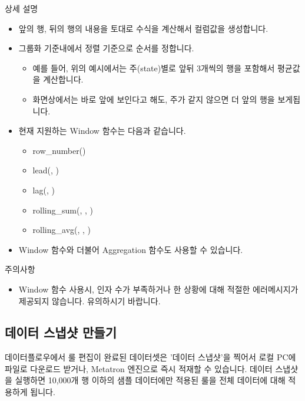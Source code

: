 \documentclass[letterpaper,10pt,english]{sphinxmanual}
\begin{document}
상세 설명
\begin{itemize}
\item {} 
앞의 행, 뒤의 행의 내용을 토대로 수식을 계산해서 컬럼값을 생성합니다.

\item {} 
그룹화 기준내에서 정렬 기준으로 순서를 정합니다.
\begin{itemize}
\item {} 
예를 들어, 위의 예시에서는 주(state)별로 앞뒤 3개씩의 행을 포함해서 평균값을 계산합니다.

\item {} 
화면상에서는 바로 앞에 보인다고 해도, 주가 같지 않으면 더 앞의 행을 보게됩니다.

\end{itemize}

\item {} 
현재 지원하는 Window 함수는 다음과 같습니다.
\begin{itemize}
\item {} 
row\_number()

\item {} 
lead(, )

\item {} 
lag(, )

\item {} 
rolling\_sum(, , )

\item {} 
rolling\_avg(, , )

\end{itemize}

\item {} 
Window 함수와 더불어 Aggregation 함수도 사용할 수 있습니다.

\end{itemize}

주의사항
\begin{itemize}
\item {} 
Window 함수 사용시, 인자 수가 부족하거나 한 상황에 대해 적절한 에러메시지가 제공되지 않습니다. 유의하시기 바랍니다.

\end{itemize}


\subsection{데이터 스냅샷 만들기}
\label{\detokenize{discovery/part07/create_a_datasnapshot:id1}}\label{\detokenize{discovery/part07/create_a_datasnapshot::doc}}
데이터플로우에서 룰 편집이 완료된 데이터셋은 '데이터 스냅샷'을 찍어서 로컬 PC에 파일로 다운로드 받거나, Metatron 엔진으로 즉시 적재할 수 있습니다. 데이터 스냅샷을 실행하면 10,000개 행 이하의 샘플 데이터에만 적용된 룰을 전체 데이터에 대해 적용하게 됩니다.
\end{document}
